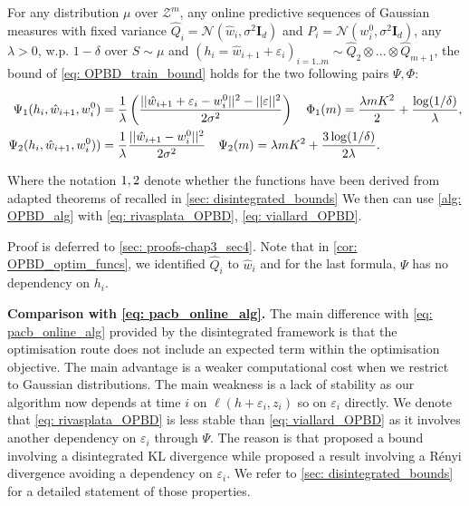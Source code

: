 \begin{corollary}
  \label{cor: OPBD_optim_funcs}
  For any distribution $\mu$ over $\mathcal{Z}^m$, any online predictive sequences of Gaussian measures with fixed variance $\hat{Q}_i= \mathcal{N}(\hat{w}_i, \sigma^2\mathbf{I}_d)$ and $P_i= \mathcal{N}(w_i^0,\sigma^2\mathbf{I}_d)$, any $\lambda>0$, w.p. $1-\delta$ over $S\sim\mu$ and $(h_i=\hat{w}_{i+1} + \varepsilon_i)_{i=1..m}\sim \hat{Q}_2\otimes...\otimes \hat{Q}_{m+1}$,
  the bound of \cref{eq: OPBD_train_bound} holds for the two following pairs $\Psi,\Phi$:

\begin{align}
  \label{eq: rivasplata_OPBD}
     \Psi_{\normalfont1}(h_i,\hat{w}_{i+1}, w_i^0) & = \frac{1}{\lambda}\left( \frac{||\hat{w}_{i+1} + \varepsilon_i- w_i^0||^2 - ||\varepsilon||^2}{2\sigma^2} \right) \quad \Phi_{\normalfont1}(m) = \frac{\lambda m K^2}{2} + \frac{\log(1/\delta)}{\lambda},\\
    \label{eq: viallard_OPBD}
    \Psi_{\normalfont2}(h_i, \hat{w}_{i+1}, w_i^0)) &  = \frac{1}{\lambda}\frac{||\hat{w}_{i+1}-w_i^0||^2}{2\sigma^2} \quad \Psi_{\normalfont2}(m) = \lambda m K^2 + \frac{3\log(1/\delta)}{2\lambda}.
  \end{align}

  Where the notation $\normalfont1, \normalfont2$ denote whether the functions have been derived from adapted theorems of \citealp{rivasplata2020pac,viallard2023general} recalled in \cref{sec: disintegrated_bounds}
  We then can use \cref{alg: OPBD_alg} with  \cref{eq: rivasplata_OPBD}, \cref{eq: viallard_OPBD}.

\end{corollary}

Proof is deferred to \cref{sec: proofs-chap3_sec4}. Note that in \cref{cor: OPBD_optim_funcs}, we identified $\hat{Q}_i$ to $\hat{w}_i$ and for the last formula, $\Psi$ has no dependency on $h_i$.

\textbf{Comparison with \cref{eq: pacb_online_alg}.} The main difference with \cref{eq: pacb_online_alg} provided by the disintegrated framework is that the optimisation route does not include an expected term within the optimisation objective. The main advantage is a weaker computational cost when we restrict to Gaussian distributions. The main weakness is a lack of stability as our algorithm now depends at time $i$ on $\ell(h+\varepsilon_i,z_i)$ so on $\varepsilon_i$ directly.
We denote that \cref{eq: rivasplata_OPBD} is less stable than \cref{eq: viallard_OPBD} as it involves another dependency on $\varepsilon_i$ through $\Psi$.
The reason is that \cite{rivasplata2020pac} proposed a bound involving a disintegrated KL divergence while \cite{viallard2023general} proposed a result involving a Rényi divergence avoiding a dependency on $\varepsilon_i$. We refer to \cref{sec: disintegrated_bounds} for a detailed statement of those properties.

